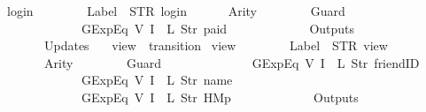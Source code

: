 \begin{isabellebody}
{\isachardoublequoteopen}login{}\ {\isasymequiv}\ {\isasymlparr}\isanewline
\ \ \ \ \ \ Label\ {\isacharequal}\ STR\ {\isacharprime}{\isacharprime}login{\isacharprime}{\isacharprime}{\isacharcomma}\isanewline
\ \ \ \ \ \ Arity\ {\isacharequal}\ {}{\isacharcomma}\isanewline
\ \ \ \ \ \ Guard\ {\isacharequal}\ {\isacharbrackleft}\isanewline
\ \ \ \ \ \ \ \ \ \ \ \ GExp{\isachardot}Eq\ {\isacharparenleft}V\ {\isacharparenleft}I\ {}{\isacharparenright}{\isacharparenright}\ {\isacharparenleft}L\ {\isacharparenleft}Str\ {\isacharprime}{\isacharprime}paid{\isacharprime}{\isacharprime}{\isacharparenright}{\isacharparenright}\isanewline
\ \ \ \ \ \ {\isacharbrackright}{\isacharcomma}\isanewline
\ \ \ \ \ \ Outputs\ {\isacharequal}\ {\isacharbrackleft}{\isacharbrackright}{\isacharcomma}\isanewline
\ \ \ \ \ \ Updates\ {\isacharequal}\ {\isacharbrackleft}{\isacharbrackright}\isanewline
{\isasymrparr}{\isachardoublequoteclose}\isanewline
\isanewline
{}\isamarkupfalse%
\ {\isachardoublequoteopen}view{\isachardoublequoteclose}\ {\isacharcolon}{\isacharcolon}\ {\isachardoublequoteopen}transition{\isachardoublequoteclose}\ \isanewline
{\isachardoublequoteopen}view\ {\isasymequiv}\ {\isasymlparr}\isanewline
\ \ \ \ \ \ Label\ {\isacharequal}\ STR\ {\isacharprime}{\isacharprime}view{\isacharprime}{\isacharprime}{\isacharcomma}\isanewline
\ \ \ \ \ \ Arity\ {\isacharequal}\ {}{\isacharcomma}\isanewline
\ \ \ \ \ \ Guard\ {\isacharequal}\ {\isacharbrackleft}\isanewline
\ \ \ \ \ \ \ \ \ \ \ \ GExp{\isachardot}Eq\ {\isacharparenleft}V\ {\isacharparenleft}I\ {}{\isacharparenright}{\isacharparenright}\ {\isacharparenleft}L\ {\isacharparenleft}Str\ {\isacharprime}{\isacharprime}friendID{\isacharprime}{\isacharprime}{\isacharparenright}{\isacharparenright}{\isacharcomma}\isanewline
\ \ \ \ \ \ \ \ \ \ \ \ GExp{\isachardot}Eq\ {\isacharparenleft}V\ {\isacharparenleft}I\ {}{\isacharparenright}{\isacharparenright}\ {\isacharparenleft}L\ {\isacharparenleft}Str\ {\isacharprime}{\isacharprime}name{\isacharprime}{\isacharprime}{\isacharparenright}{\isacharparenright}{\isacharcomma}\isanewline
\ \ \ \ \ \ \ \ \ \ \ \ GExp{\isachardot}Eq\ {\isacharparenleft}V\ {\isacharparenleft}I\ {}{\isacharparenright}{\isacharparenright}\ {\isacharparenleft}L\ {\isacharparenleft}Str\ {\isacharprime}{\isacharprime}HM{}p{\isacharprime}{\isacharprime}{\isacharparenright}{\isacharparenright}\isanewline
\ \ \ \ \ \ {\isacharbrackright}{\isacharcomma}\isanewline
\ \ \ \ \ \ Outputs\ {\isacharequal}\ {\isacharbrackleft}{\isacharbrackright}{\isacharcomma}\isanewline

\end{isabellebody}
